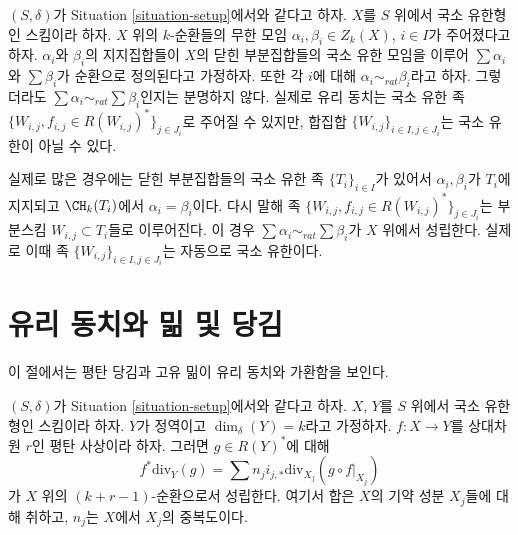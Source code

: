 \begin{remark}
\label{remark-infinite-sums-rational-equivalences}
$(S, \delta)$가 Situation \ref{situation-setup}에서와 같다고 하자.
$X$를 $S$ 위에서 국소 유한형인 스킴이라 하자. $X$ 위의 $k$-순환들의
무한 모임 $\alpha_i, \beta_i \in Z_k(X)$, $i \in I$가 주어졌다고 하자.
$\alpha_i$와 $\beta_i$의 지지집합들이 $X$의 닫힌 부분집합들의 국소 유한
모임을 이루어 $\sum \alpha_i$와 $\sum \beta_i$가 순환으로 정의된다고
가정하자. 또한 각 $i$에 대해 $\alpha_i \sim_{rat} \beta_i$라고 하자.
그렇더라도 $\sum \alpha_i \sim_{rat} \sum \beta_i$인지는 분명하지 않다.
실제로 유리 동치는 국소 유한 족
$\{W_{i, j}, f_{i, j} \in R(W_{i, j})^*\}_{j \in J_i}$로 주어질 수
있지만, 합집합 $\{W_{i, j}\}_{i \in I, j\in J_i}$는 국소 유한이 아닐
수 있다.

\medskip\noindent
실제로 많은 경우에는 닫힌 부분집합들의 국소 유한 족
$\{T_i\}_{i \in I}$가 있어서 $\alpha_i, \beta_i$가 $T_i$에 지지되고
$\CH_k(T_i)$에서 $\alpha_i = \beta_i$이다. 다시 말해 족
$\{W_{i, j}, f_{i, j} \in R(W_{i, j})^*\}_{j \in J_i}$는 부분스킴
$W_{i, j} \subset T_i$들로 이루어진다. 이 경우
$\sum \alpha_i \sim_{rat} \sum \beta_i$가 $X$ 위에서 성립한다. 실제로
이때 족 $\{W_{i, j}\}_{i \in I, j\in J_i}$는 자동으로 국소 유한이다.
\end{remark}






\section{유리 동치와 밂 및 당김}
\label{section-properties-rational-equivalence}

\noindent
이 절에서는 평탄 당김과 고유 밂이 유리 동치와 가환함을 보인다.

\begin{lemma}
\label{lemma-prepare-flat-pullback-rational-equivalence}
$(S, \delta)$가 Situation \ref{situation-setup}에서와 같다고 하자.
$X$, $Y$를 $S$ 위에서 국소 유한형인 스킴이라 하자. $Y$가 정역이고
$\dim_\delta(Y) = k$라고 가정하자. $f : X \to Y$를 상대차원 $r$인 평탄
사상이라 하자. 그러면 $g \in R(Y)^*$에 대해
$$
f^*\text{div}_Y(g) =
\sum n_j i_{j, *}\text{div}_{X_j}(g \circ f|_{X_j})
$$
가 $X$ 위의 $(k + r - 1)$-순환으로서 성립한다. 여기서 합은 $X$의
기약 성분 $X_j$들에 대해 취하고, $n_j$는 $X$에서 $X_j$의 중복도이다.
\end{lemma}


